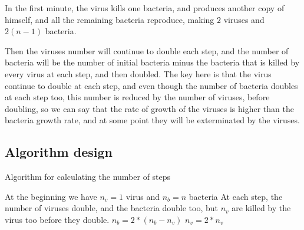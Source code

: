 \documentclass{article}
\begin{document}
In the first minute, the virus kills one bacteria, and produces another copy of himself, and all the remaining bacteria reproduce, making $2$ viruses and $2(n-1)$ bacteria.

Then the viruses number will continue to double each step, and the number of bacteria will be the number of initial bacteria minus the bacteria that is killed by every virus at each step, and then doubled. The key here is that the virus continue to double at each step, and even though the number of bacteria doubles at each step too, this number is reduced by the number of viruses, before doubling, so we can say that the rate of growth of the viruses is higher than the bacteria growth rate, and at some point they will be exterminated by the viruses.

\subsection*{Algorithm design}

\begin{algorithm}[H]
\caption{Algorithm for calculating the number of steps}
\begin{algorithmic}[1]
\State At the beginning we have $n_v = 1$ virus and $n_b = n$ bacteria
\State At each step, the number of viruses double, and the bacteria double too, but $n_v$ are killed by the virus too before they double.
 \State $n_b = 2*(n_b-n_v)$
 \State $n_v = 2*n_v$
\EndWhile
\end{algorithmic}
\end{algorithm}
\end{document}

